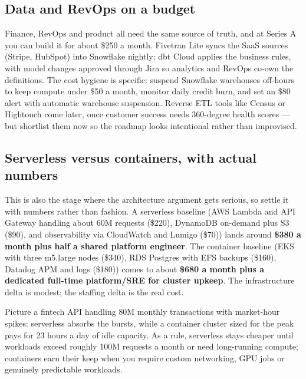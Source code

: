 \subsection{Data and RevOps on a budget}


Finance, RevOps and product all need the same source of truth, and at Series A you can build it for about \$250 a month. Fivetran Lite syncs the SaaS sources (Stripe, HubSpot) into Snowflake nightly; dbt Cloud applies the business rules, with model changes approved through Jira so analytics and RevOps co-own the definitions. The cost hygiene is specific: suspend Snowflake warehouses off-hours to keep compute under \$50 a month, monitor daily credit burn, and set an \$80 alert with automatic warehouse suspension. Reverse ETL tools like Census or Hightouch come later, once customer success needs 360-degree health scores — but shortlist them now so the roadmap looks intentional rather than improvised.



\subsection{Serverless versus containers, with actual numbers}


This is also the stage where the architecture argument gets serious, so settle it with numbers rather than fashion. A serverless baseline (AWS Lambda and API Gateway handling about 60M requests (\$220), DynamoDB on-demand plus S3 (\$90), and observability via CloudWatch and Lumigo (\$70)) lands around \textbf{\$380 a month plus half a shared platform engineer}. The container baseline (EKS with three m5.large nodes (\$340), RDS Postgres with EFS backups (\$160), Datadog APM and logs (\$180)) comes to about \textbf{\$680 a month plus a dedicated full-time platform/SRE for cluster upkeep}. The infrastructure delta is modest; the staffing delta is the real cost.


Picture a fintech API handling 80M monthly transactions with market-hour spikes: serverless absorbs the bursts, while a container cluster sized for the peak pays for 23 hours a day of idle capacity. As a rule, serverless stays cheaper until workloads exceed roughly 100M requests a month or need long-running compute; containers earn their keep when you require custom networking, GPU jobs or genuinely predictable workloads.


